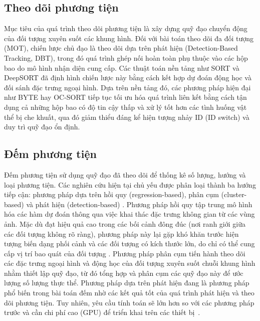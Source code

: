 \subsection{Theo dõi phương tiện}

Mục tiêu của quá trình theo dõi phương tiện là xây dựng quỹ đạo chuyển động của
đối tượng xuyên suốt các khung hình. Đối với bài toán theo dõi đa đối tượng
(MOT), chiến lược chủ đạo là theo dõi dựa trên phát hiện (Detection-Based
Tracking, DBT), trong đó quá trình ghép nối hoàn toàn phụ thuộc vào các hộp bao
do mô hình nhận diện cung cấp. Các thuật toán nền tảng như SORT và DeepSORT đã
định hình chiến lược này bằng cách kết hợp dự đoán động học và đối sánh đặc
trưng ngoại hình. Dựa trên nền tảng đó, các phương pháp hiện đại như BYTE
hay OC-SORT tiếp tục tối ưu hóa quá trình liên kết bằng cách tận dụng cả những
hộp bao có độ tin cậy thấp và xử lý tốt hơn các tình huống vật thể bị che
khuất, qua đó giảm thiểu đáng kể hiện tượng nhảy ID (ID switch) và duy trì quỹ
đạo ổn định.

\subsection{Đếm phương tiện}

Đếm phương tiện sử dụng quỹ đạo đã theo dõi để thống kê số lượng, hướng và loại
phương tiện. Các nghiên cứu hiện tại chủ yếu được phân loại thành ba hướng tiếp
cận: phương pháp dựa trên hồi quy (regression-based), phân cụm (cluster-based)
và phát hiện (detection-based) \cite{dai2019}. Phương pháp hồi quy tập trung mô
hình hóa các hàm dự đoán thông qua việc khai thác đặc trưng không gian từ các
vùng ảnh.  Mặc dù đạt hiệu quả cao trong các bối cảnh đông đúc (nơi ranh giới
giữa các đối tượng không rõ ràng), phương pháp này lại gặp khó khăn trước hiện
tượng biến dạng phối cảnh và các đối tượng có kích thước lớn, do chỉ có thể
cung cấp vị trí bao quát của đối tượng \cite{shokri2025}. Phương pháp phân cụm
tiến hành theo dõi các đặc trưng ngoại hình và động học của đối tượng xuyên
suốt chuỗi khung hình nhằm thiết lập quỹ đạo, từ đó tổng hợp và phân cụm các
quỹ đạo này để ước lượng số lượng thực thể. Phương pháp dựa trên phát hiện đang
là phương pháp phổ biến trong bài toán đếm nhờ các kết quả tốt của quá trình
phát hiện và theo dõi phương tiện. Tuy nhiên, yêu cầu tính toán sẽ lớn hơn so
với các phương pháp trước và cần chi phí cao (GPU) để triển khai trên các thiết
bị~\cite{shokri2025}.
